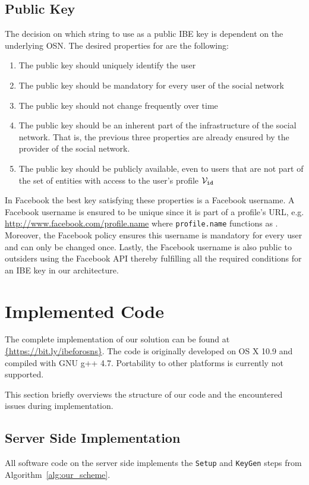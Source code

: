 \subsection{Public Key}
The decision on which string to use as a public IBE key \id{} is dependent on the underlying OSN. The desired properties for \id{} are the following:
\begin{enumerate}
 \item The public key should uniquely identify the user
 \item The public key should be mandatory for every user of the social network
 \item The public key should not change frequently over time
 \item The public key should be an inherent part of the infrastructure of the social network. That is, the previous three properties are already ensured by the provider of the social network.
 \item The public key should be publicly available, even to users that are not part of the set of entities with access to the user's profile $\mathcal{V}_{\mathtt{id}_{}}$
\end{enumerate}
In Facebook the best key satisfying these properties is a Facebook username. A Facebook username is ensured to be unique since it is part of a profile's URL, e.g. \url{http://www.facebook.com/profile.name} where \texttt{profile.name} functions as \id{}. Moreover, the Facebook policy ensures this username is mandatory for every user and can only be changed once. Lastly, the Facebook username is also public to outsiders using the Facebook API thereby fulfilling all the required conditions for an IBE key in our architecture.

\section{Implemented Code}
\label{sec:implemented_code}
The complete implementation of our solution can be found at \url{{https://bit.ly/ibeforosns}}. The code is originally developed on OS X 10.9 and compiled with GNU g++ 4.7. Portability to other platforms is currently not supported. 

This section briefly overviews the structure of our code and the encountered issues during implementation.


\subsection{Server Side Implementation}
All software code on the server side implements the \texttt{Setup} and \texttt{KeyGen} steps from Algorithm~\ref{alg:our_scheme}.


